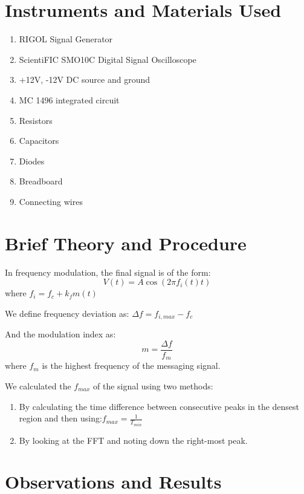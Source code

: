 \documentclass{article}
\begin{document}
\section{Instruments and Materials Used}
\begin{enumerate}
  \item RIGOL Signal Generator
  \item ScientiFIC SMO10C Digital Signal Oscilloscope
  \item +12V, -12V DC source and ground
  \item MC 1496 integrated circuit
  \item Resistors
  \item Capacitors
  \item Diodes
  \item Breadboard
  \item Connecting wires
\end{enumerate}
\section{Brief Theory and Procedure}
In frequency modulation, the final signal is of the form:
\begin{equation}
    V(t)=A\cos(2\pi f_i(t)t)
\end{equation}
where $f_i=f_c+k_fm(t)$

We define frequency deviation as: $\Delta f=f_{i,max}-f_c$

And the modulation index as:
\begin{equation}
  m=\frac{\Delta f}{f_m}    
\end{equation}
where $f_m$ is the highest frequency of the messaging signal.

We calculated the $f_{max}$ of the signal using two methods:
\begin{enumerate}
  \item By calculating the time difference between consecutive peaks in the densest region and then using:$f_{max}=\frac{1}{T_{min}}$
  \item By looking at the FFT and noting down the right-most peak.
\end{enumerate}

\section{Observations and Results}
\end{document}
